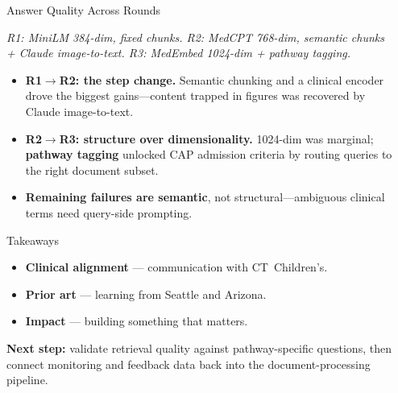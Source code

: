 \documentclass[final]{beamer}
\newlength{\sepwid}
\newlength{\onecolwid}
\begin{document}
\begin{frame}[t]
\begin{columns}[t]
\begin{column}{\onecolwid}
\begin{block}{Answer Quality Across Rounds}
\begin{center}
\vspace{0.3em}
{\footnotesize\color{PathwaysGray}\itshape R1: MiniLM 384-dim, fixed chunks. R2: MedCPT 768-dim, semantic chunks + Claude image-to-text. R3: MedEmbed 1024-dim + pathway tagging.}
\end{center}

\vspace{0.4em}
\justifying
\begin{itemize}
\item \textbf{R1$\rightarrow$R2: the step change.} Semantic chunking and a clinical encoder drove the biggest gains---content trapped in figures was recovered by Claude image-to-text.
\item \textbf{R2$\rightarrow$R3: structure over dimensionality.} 1024-dim was marginal; \textbf{pathway tagging} unlocked CAP admission criteria by routing queries to the right document subset.
\item \textbf{Remaining failures are semantic}, not structural---ambiguous clinical terms need query-side prompting.
\end{itemize}
\end{block}

\begin{block}{Takeaways}
\normalsize
\justifying
\begin{itemize}
\item \textbf{Clinical alignment} --- communication with CT~Children's.
\item \textbf{Prior art} --- learning from Seattle and Arizona.
\item \textbf{Impact} --- building something that matters.
\end{itemize}

\vspace{0.3em}
\textbf{Next step:} validate retrieval quality against pathway-specific questions, then connect monitoring and feedback data back into the document-processing pipeline.
\end{block}

\end{column}
\begin{column}{\sepwid}\end{column}

\end{columns}
\end{frame}
\end{document}
